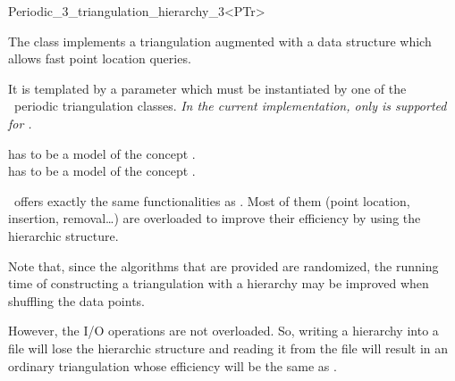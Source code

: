 

\begin{ccRefClass}{Periodic_3_triangulation_hierarchy_3<PTr>}

\ccDefinition

The class  implements a
triangulation augmented with a data structure which allows fast point
location queries. 


\ccParameters

It is templated by a parameter which must be instantiated by one of the \cgal\
periodic triangulation classes.  \textit{In the current
  implementation, only  is
  supported for \ccc{PTr}.} 

 has to be a model of the concept
.\\
 has to be a model of the concept
.

\ccInheritsFrom


\ccRefName\ offers exactly the same functionalities as .
Most of them (point location, insertion, removal\ldots) are overloaded to
improve their efficiency by using the hierarchic structure. 

Note that, since the algorithms that are provided are randomized, the
running time of constructing a triangulation with a hierarchy may be
improved when shuffling the data points.

However, the I/O operations are not overloaded. So, writing a
hierarchy into a file will lose the hierarchic structure and reading
it from the file will result in an ordinary triangulation whose
efficiency will be the same as .


\end{ccRefClass}
